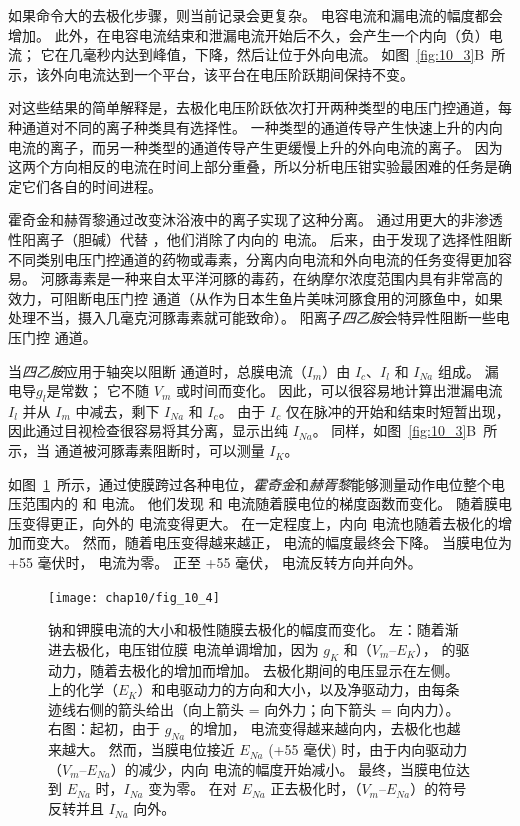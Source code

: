 如果命令大的去极化步骤，则当前记录会更复杂。
电容电流和漏电流的幅度都会增加。
此外，在电容电流结束和泄漏电流开始后不久，会产生一个内向（负）电流；
它在几毫秒内达到峰值，下降，然后让位于外向电流。
如图~\ref{fig:10_3}B~所示，该外向电流达到一个平台，该平台在电压阶跃期间保持不变。


对这些结果的简单解释是，去极化电压阶跃依次打开两种类型的电压门控通道，每种通道对不同的离子种类具有选择性。
一种类型的通道传导产生快速上升的内向电流的离子，而另一种类型的通道传导产生更缓慢上升的外向电流的离子。
因为这两个方向相反的电流在时间上部分重叠，所以分析电压钳实验最困难的任务是确定它们各自的时间进程。


霍奇金和赫胥黎通过改变沐浴液中的离子实现了这种分离。
通过用更大的非渗透性阳离子（胆碱）代替 ，他们消除了内向的  电流。
后来，由于发现了选择性阻断不同类别电压门控通道的药物或毒素，分离内向电流和外向电流的任务变得更加容易。
河豚毒素是一种来自太平洋河豚的毒药，在纳摩尔浓度范围内具有非常高的效力，可阻断电压门控  通道（从作为日本生鱼片美味河豚食用的河豚鱼中，如果处理不当，摄入几毫克河豚毒素就可能致命）。
阳离子\textit{四乙胺}会特异性阻断一些电压门控  通道。


当\textit{四乙胺}应用于轴突以阻断  通道时，总膜电流（$I_m$）由 $I_c$、$I_l$ 和 $I_{Na}$ 组成。
漏电导$g_l$是常数；
它不随 $V_m$ 或时间而变化。
因此，可以很容易地计算出泄漏电流 $I_l$ 并从 $I_m$ 中减去，剩下 $I_{Na}$ 和 $I_c$。
由于 $I_c$ 仅在脉冲的开始和结束时短暂出现，因此通过目视检查很容易将其分离，显示出纯 $I_{Na}$。
同样，如图~\ref{fig:10_3}B~所示，当  通道被河豚毒素阻断时，可以测量 $I_K$。


如图~\ref{fig:10_4}~所示，通过使膜跨过各种电位，\textit{霍奇金}和\textit{赫胥黎}能够测量动作电位整个电压范围内的  和  电流。
他们发现  和  电流随着膜电位的梯度函数而变化。
随着膜电压变得更正，向外的  电流变得更大。
在一定程度上，内向  电流也随着去极化的增加而变大。
然而，随着电压变得越来越正， 电流的幅度最终会下降。
当膜电位为 +55 毫伏时， 电流为零。
正至 +55 毫伏， 电流反转方向并向外。


\begin{figure}[htbp]
	\centering
	\texttt{[image: chap10/fig\_10\_4]}
	\caption{钠和钾膜电流的大小和极性随膜去极化的幅度而变化。
		左：随着渐进去极化，电压钳位膜  电流单调增加，因为 $g_K$ 和（$V_m – E_K$）， 的驱动力，随着去极化的增加而增加。
		去极化期间的电压显示在左侧。
		 上的化学（$E_K$）和电驱动力的方向和大小，以及净驱动力，由每条迹线右侧的箭头给出（向上箭头 = 向外力；向下箭头 = 向内力）。
		右图：起初，由于 $g_{Na}$ 的增加， 电流变得越来越向内，去极化也越来越大。
		然而，当膜电位接近 $E_{Na}$ (+55 毫伏) 时，由于内向驱动力（$V_m – E_{Na}$）的减少，内向  电流的幅度开始减小。
		最终，当膜电位达到 $E_{Na}$ 时，$I_{Na}$ 变为零。
		在对 $E_{Na}$ 正去极化时，（$V_m – E_{Na}$）的符号反转并且 $I_{Na}$ 向外。}
	\label{fig:10_4}
\end{figure}


